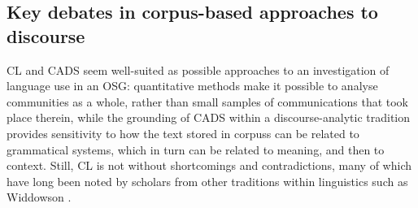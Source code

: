 


\subsection{Key debates in corpus-based approaches to discourse}

\gls{CL} and \gls{CADS} seem well\hyp{}suited as possible approaches to an investigation of language use in an \gls{OSG}: quantitative methods make it possible to analyse communities as a whole, rather than small samples of communications that took place therein, while the grounding of \gls{CADS} within a discourse-analytic tradition provides sensitivity to how the text stored in \glspl{corpus} can be related to grammatical systems, which in turn can be related to meaning, and then to context. %
Still, \gls{CL} is not without shortcomings and contradictions, many of which have long been noted by scholars from other traditions within linguistics such as Widdowson \parencite*{widdowson_description_1991,widdowson_limitations_2000,widdowson_text_2008}.

